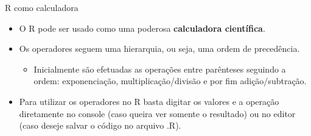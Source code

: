 \documentclass[
  ignorenonframetext,
  serif,
  professionalfont,
  usenames,
  dvipsnames,
  aspectratio = 169]{beamer}
\providecommand{\tightlist}{%
  \setlength{\itemsep}{0pt}\setlength{\parskip}{0pt}}
\renewcommand{\tightlist}{%
  \setlength{\itemsep}{0\baselineskip}
  \setlength{\parskip}{0.25\baselineskip}
}
\begin{document}
\begin{frame}{R como calculadora}
\protect\hypertarget{r-como-calculadora-1}{}
\begin{itemize}
\item
  O R pode ser usado como uma poderosa \textbf{calculadora científica}.
\item
  Os operadores seguem uma hierarquia, ou seja, uma ordem de
  precedência.

  \begin{itemize}
  \tightlist
  \item
    Inicialmente são efetuadas as operações entre parênteses seguindo a
    ordem: exponenciação, multiplicação/divisão e por fim
    adição/subtração.
  \end{itemize}
\item
  Para utilizar os operadores no R basta digitar os valores e a operação
  diretamente no console (caso queira ver somente o resultado) ou no
  editor (caso deseje salvar o código no arquivo .R).
\end{itemize}
\end{frame}
\end{document}
